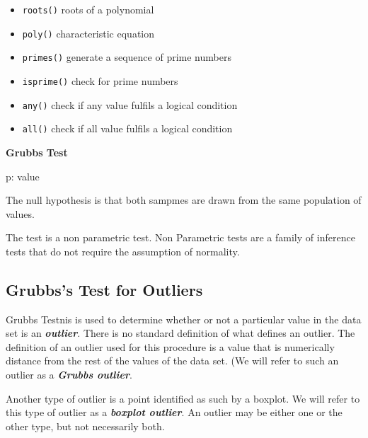 \documentclass[12pt]{article} %
\begin{document}




\begin{itemize}
\item \texttt{roots()} roots of a polynomial
\item \texttt{poly()} characteristic equation
\item \texttt{primes()} generate a sequence of prime numbers
\item \texttt{isprime()} check for prime numbers
\item \texttt{any()} check if any value fulfils a logical condition
\item \texttt{all()} check if all value fulfils a logical condition
\end{itemize}

 \newpage

\textbf{Grubbs Test}

p: value



The null hypothesis is that both sampmes are drawn from the same population of values.

The test is a non parametric test. Non Parametric tests are a family of inference tests that do not require the assumption of normality.
\subsection{Grubbs's Test for Outliers}
Grubbs Testnis is used to determine whether or not a particular value in the data set is an \textbf{\textit{outlier}}. There is no standard definition of what defines an outlier. The definition of an outlier used for this procedure is a value that is numerically distance from the rest of the values of the data set. (We will refer to such an outlier as a \textbf{\textit{Grubbs outlier}}.


Another type of outlier is a point identified as such by a boxplot. We will refer to this type of outlier as a \textbf{\textit{boxplot outlier}}.  An outlier may be either one or the other type, but not necessarily both.
\end{document}
